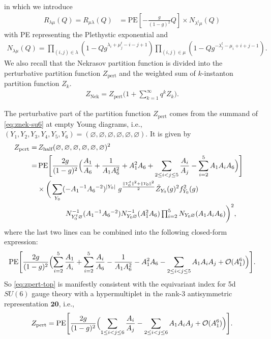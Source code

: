 \documentclass[letterpaper, 11pt]{article}
\begin{document}
in which we introduce
\begin{align}
R_{\lambda \mu} (Q)=R_{ \mu\lambda} (Q)
&= \text{PE} \left[ - \frac{g}{(1-g)^2} Q \right]
\times N_{\lambda^t \mu} (Q)
\end{align}
with PE representing the Plethystic exponential
 and 
\begin{align}
N_{\lambda \mu} (Q) 
= \prod_{(i,j) \in \lambda} \left( 1 - Q g^{\lambda_i + \mu_j^t -i-j+1} \right)
\prod_{(i,j) \in \mu} \left( 1 - Q g^{-\lambda^t_j - \mu_i + i + j - 1} \right).
\end{align}
We also recall that the Nekrasov partition function is divided into the perturbative partition function $Z_{\text{pert}}$ and the weighted sum of $k$-instanton partition function $Z_k$.
\begin{align}
Z_{\text{Nek}} = Z_{\text{pert}}\Big(1 + \sum_{k=1}^{\infty}q^kZ_k\Big).
\end{align}

The perturbative part of the partition function $Z_{\text{pert}}$ comes from the summand of \eqref{eq:znek-su6} at empty Young diagrams, i.e., $(Y_1, Y_2, Y_3, Y_4, Y_5, Y_6) = (\varnothing,\varnothing,\varnothing,\varnothing,\varnothing,\varnothing)$. It is given by
\begin{align}
  \label{eq:zpert-top}
Z_{\rm pert} 
=& \,
Z_{\text{half}}(\varnothing,\varnothing,\varnothing,\varnothing,\varnothing,\varnothing)^2
\cr
=&\, 
\text{PE} \Biggl[ 
\frac{2g}{(1-g)^2} 
\Bigl( \frac{A_1}{A_6} + \frac{1}{A_1A_6^2} + A_1^2  A_6 
+ \sum_{2 \le i <  j \le 5} \frac{A_i}{A_j}
- \sum_{i=2}^5 A_1 A_i  A_6
\Bigr)
\Biggr]
\cr 
& 
\times \bigg(\sum_{Y_0} ( - A_1{}^{-1} A_6{}^{-2})^{|Y_0|} \ 
g^{\frac{\Vert Y_0^t \Vert ^2+\Vert Y_0\Vert ^2}{2}} \tilde{Z}_{Y_0}(g)^2 f_{Y_0}^2(g)
\cr 
& \qquad \qquad
\textstyle N_{Y_0^t \varnothing }^{-1} (A_1{}^{-1} A_6{}^{-2})
 N^{-1}_{Y_0 \varnothing } (A_1^2  A_6)\prod_{i=2}^5 N_{Y_0 \varnothing } (A_1 A_i  A_6)\bigg)^2 ,
\end{align}
where the last two lines can be  combined into the following closed-form expression:
\begin{align}
  \text{PE} \Biggl[ 
    \frac{2g}{(1-g)^2} 
    \Bigl(\sum_{i=2}^5  \frac{A_1}{A_i} +\sum_{i=2}^5  \frac{A_i}{A_6} - \frac{1}{A_1A_6^2} - A_1^2  A_6 
    - \sum_{2\leq i<j \leq 5} A_1 A_i  A_j + \mathcal{O}(A_1^6)
    \Bigr)
    \Biggr].
\end{align}
So \eqref{eq:zpert-top} is manifestly consistent with the equivariant index  \cite{Shadchin:2005mx} for 5d $SU(6)$ gauge theory with a hypermultiplet in the rank-3 antisymmetric representation $\mathbf{20}$, i.e., 
\begin{align}
  Z_{\rm pert}  = \text{PE} \Biggl[ 
    \frac{2g}{(1-g)^2} 
    \Bigl(\sum_{1\leq i<j \leq 6}  \frac{A_i}{A_j} 
    - \sum_{2\leq i<j \leq 6} A_1 A_i  A_j + \mathcal{O}(A_1^6)
    \Bigr)
    \Biggr].
\end{align}
\end{document}
